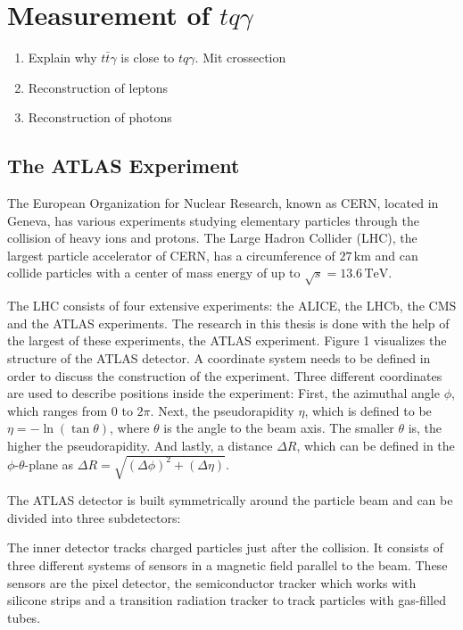 


\chapter{Measurement of \texorpdfstring{$tq\gamma$}{tqGamma}}
\label{chap:measurement}

\begin{enumerate}
    \item Explain why $t\bar{t}\gamma$ is close to $tq\gamma$. Mit crossection
    \item Reconstruction of leptons
    \item Reconstruction of photons
\end{enumerate}
\section{The ATLAS Experiment}
\label{sec:atlas}
The European Organization for Nuclear Research, known as CERN, located in Geneva, has various experiments studying elementary particles through the collision of heavy ions and protons. 
The Large Hadron Collider (LHC), the largest particle accelerator of CERN, has a circumference of $27 \,\si{\kilo\metre}$ and can collide particles with a center of mass energy of up to $\sqrt{s} = 13.6 \,\si{\tera\electronvolt}$. 


The LHC consists of four extensive experiments: the ALICE, the LHCb, the CMS and the ATLAS experiments. The research in this thesis is done with the help of the largest of these experiments, the ATLAS experiment. Figure 1 visualizes the structure of the ATLAS detector. 
A coordinate system needs to be defined in order to discuss the construction of the experiment. Three different coordinates are used to describe positions inside the experiment: First, the azimuthal angle $\phi$, which ranges from $0$ to $2\pi$. 
Next, the pseudorapidity $\eta$, which is defined to be $\eta = -\ln(\tan \theta)$, where $\theta$ is the angle to the beam axis. The smaller $\theta$ is, the higher the pseudorapidity. And lastly, a distance $\Delta R$, which can be defined in the $\phi$-$\theta$-plane as $\Delta R = \sqrt{(\Delta \phi)^2 +(\Delta \eta)}$.

The ATLAS detector is built symmetrically around the particle beam and can be divided into three subdetectors:

The inner detector tracks charged particles just after the collision. 
It consists of three different systems of sensors in a magnetic field parallel to the beam. 
These sensors are the pixel detector, the semiconductor tracker which works with silicone strips and a transition radiation tracker to track particles with gas-filled tubes. 

